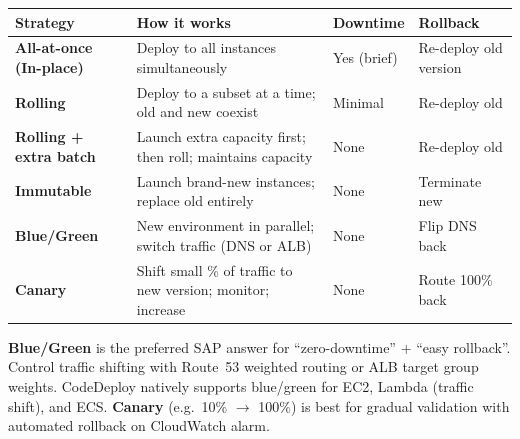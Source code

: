 \begin{comparebox}[title={Deployment strategy comparison}]
\begin{tabular}{@{}p{3.4cm}p{4.2cm}p{1.5cm}p{2.4cm}@{}}
\toprule
\textbf{Strategy} & \textbf{How it works} & \textbf{Downtime} & \textbf{Rollback} \\
\midrule
\textbf{All-at-once (In-place)} & Deploy to all instances simultaneously &
  Yes (brief) & Re-deploy old version \\[4pt]
\textbf{Rolling}        & Deploy to a subset at a time; old and new coexist &
  Minimal & Re-deploy old \\[4pt]
\textbf{Rolling + extra batch} & Launch extra capacity first; then roll; maintains capacity &
  None & Re-deploy old \\[4pt]
\textbf{Immutable}      & Launch brand-new instances; replace old entirely &
  None & Terminate new \\[4pt]
\textbf{Blue/Green}     & New environment in parallel; switch traffic (DNS or ALB) &
  None & Flip DNS back \\[4pt]
\textbf{Canary}         & Shift small \% of traffic to new version; monitor; increase &
  None & Route 100\% back \\
\bottomrule
\end{tabular}
\end{comparebox}

\begin{examtip}
\textbf{Blue/Green} is the preferred SAP answer for ``zero-downtime'' + ``easy rollback''.
Control traffic shifting with Route~53 weighted routing or ALB target group weights.
CodeDeploy natively supports blue/green for EC2, Lambda (traffic shift), and ECS.
\textbf{Canary} (e.g.\ 10\% $\rightarrow$ 100\%) is best for gradual validation with automated rollback
on CloudWatch alarm.
\end{examtip}

